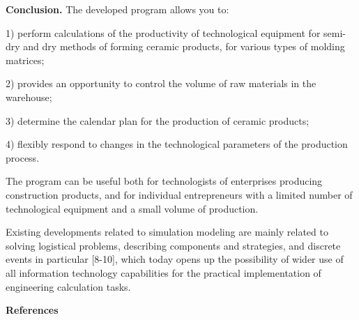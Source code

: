 {\bfseries Conclusion.} The developed program allows you to:

1) perform calculations of the productivity of technological equipment
for semi-dry and dry methods of forming ceramic products, for various
types of molding matrices;

2) provides an opportunity to control the volume of raw materials in the
warehouse;

3) determine the calendar plan for the production of ceramic products;

4) flexibly respond to changes in the technological parameters of the
production process.

The program can be useful both for technologists of enterprises
producing construction products, and for individual entrepreneurs with a
limited number of technological equipment and a small volume of
production.

Existing developments related to simulation modeling are mainly related
to solving logistical problems, describing components and strategies,
and discrete events in particular {[}8-10{]}, which today opens up the
possibility of wider use of all information technology capabilities for
the practical implementation of engineering calculation tasks.

\begin{center}
	{\bfseries References}
	\end{center}

